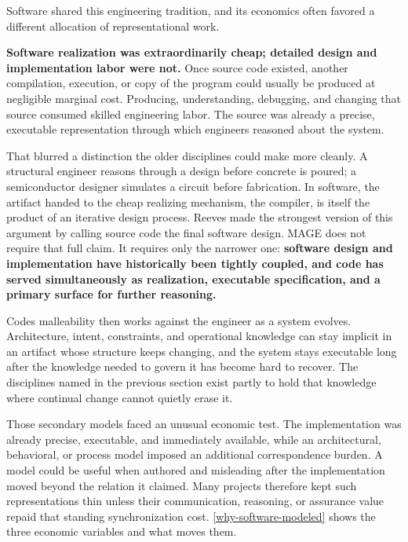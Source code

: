 Software shared this engineering tradition, and its economics often favored a different allocation of representational work.

\textbf{Software realization was extraordinarily cheap; detailed design and implementation labor were not.} Once source code existed, another compilation, execution, or copy of the program could usually be produced at negligible marginal cost. Producing, understanding, debugging, and changing that source consumed skilled engineering labor. The source was already a precise, executable representation through which engineers reasoned about the system.


That blurred a distinction the older disciplines could make more cleanly. A structural engineer reasons through a design before concrete is poured; a semiconductor designer simulates a circuit before fabrication. In software, the artifact handed to the cheap realizing mechanism, the compiler, is itself the product of an iterative design process. Reeves made the strongest version of this argument by calling source code the final software design. MAGE does not require that full claim. It requires only the narrower one: \textbf{software design and implementation have historically been tightly coupled, and code has served simultaneously as realization, executable specification, and a primary surface for further reasoning.}

Code\textquotesingle s malleability then works against the engineer as a system evolves. Architecture, intent, constraints, and operational knowledge can stay implicit in an artifact whose structure keeps changing, and the system stays executable long after the knowledge needed to govern it has become hard to recover. The disciplines named in the previous section exist partly to hold that knowledge where continual change cannot quietly erase it.

Those secondary models faced an unusual economic test. The implementation was already precise, executable, and immediately available, while an architectural, behavioral, or process model imposed an additional correspondence burden. A model could be useful when authored and misleading after the implementation moved beyond the relation it claimed. Many projects therefore kept such representations thin unless their communication, reasoning, or assurance value repaid that standing synchronization cost. \autoref{why-software-modeled} shows the three economic variables and what moves them.

